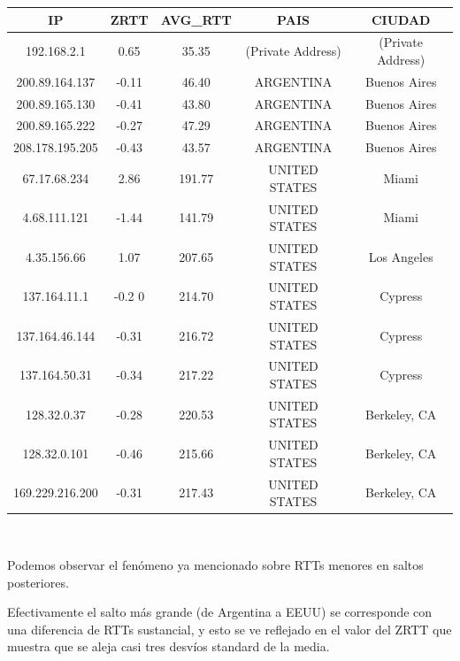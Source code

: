 \begin{tabular}{|c@{\hspace{5ex}}c@{\hspace{5ex}}c@{\hspace{5ex}}c@{\hspace{5ex}}c|}
 \hline
 \rule{0pt}{1.2em}IP & ZRTT & AVG\_RTT & PAIS & CIUDAD\\[0.2em]
 \hline

\rule{0pt}{1.2em} 192.168.2.1  &  0.65 & 35.35 & (Private Address) & (Private Address) \\[0.2em]
\rule{0pt}{1.2em} 200.89.164.137  &  -0.11 & 46.40 & ARGENTINA & Buenos Aires \\[0.2em]
\rule{0pt}{1.2em} 200.89.165.130  &  -0.41 & 43.80 & ARGENTINA & Buenos Aires \\[0.2em]
\rule{0pt}{1.2em} 200.89.165.222  &  -0.27 & 47.29 & ARGENTINA & Buenos Aires \\[0.2em]
\rule{0pt}{1.2em} 208.178.195.205  &  -0.43 & 43.57 & ARGENTINA & Buenos Aires \\[0.2em]
\rule{0pt}{1.2em} 67.17.68.234  &  2.86 & 191.77 & UNITED STATES & Miami \\[0.2em]
\rule{0pt}{1.2em} 4.68.111.121  &  -1.44 & 141.79 & UNITED STATES & Miami \\[0.2em]
\rule{0pt}{1.2em} 4.35.156.66  &  1.07 & 207.65 & UNITED STATES & Los Angeles \\[0.2em]
\rule{0pt}{1.2em} 137.164.11.1  &  -0.2 0& 214.70 & UNITED STATES & Cypress \\[0.2em]
\rule{0pt}{1.2em} 137.164.46.144  &  -0.31 & 216.72 & UNITED STATES & Cypress \\[0.2em]
\rule{0pt}{1.2em} 137.164.50.31  &  -0.34 & 217.22 & UNITED STATES & Cypress \\[0.2em]
\rule{0pt}{1.2em} 128.32.0.37  &  -0.28 & 220.53 & UNITED STATES & Berkeley, CA \\[0.2em]
\rule{0pt}{1.2em} 128.32.0.101  &  -0.46 & 215.66 & UNITED STATES & Berkeley, CA \\[0.2em]
\rule{0pt}{1.2em} 169.229.216.200  &  -0.31 & 217.43 & UNITED STATES & Berkeley, CA \\[0.2em]
\hline
 \end{tabular}

~

Podemos observar el fenómeno ya mencionado sobre RTTs menores en saltos posteriores.

Efectivamente el salto más grande (de Argentina a EEUU) se corresponde con una diferencia de RTTs sustancial, y esto se ve reflejado en el valor del ZRTT que muestra que se aleja casi tres desvíos standard de la media.

